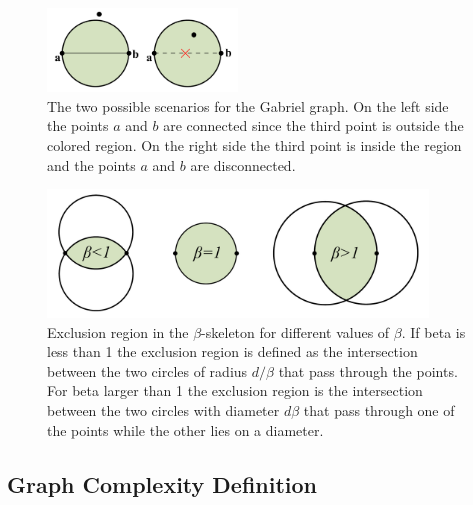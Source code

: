 \documentclass[fleqn,usenatbib]{mnras}
\begin{document}
\begin{figure}
    \centering
    \includegraphics[width=0.45\textwidth]{gabriel.pdf}
    \caption{The two possible scenarios for the Gabriel graph. On the left side the points $a$ and $b$ are connected since the third point is outside the colored region. On the right side the third point is inside the region and the points $a$ and $b$ are disconnected.}
    \label{fig:gabriel}
\end{figure}
\begin{figure}
    \centering
    \includegraphics[width=0.9\textwidth]{betaskeleton.pdf}
    \caption{Exclusion region in the $\beta$-skeleton for different values of $\beta$. If beta is less than 1 the exclusion region is defined as the intersection between the two circles of radius $d/\beta$ that pass through the points. For beta larger than 1 the exclusion region is the intersection between the two circles with diameter $d\beta$ that pass through one of the points while the other lies on a diameter.}
    \label{fig:bskeleton_area}
\end{figure}
\subsection{Graph Complexity Definition}
\end{document}
